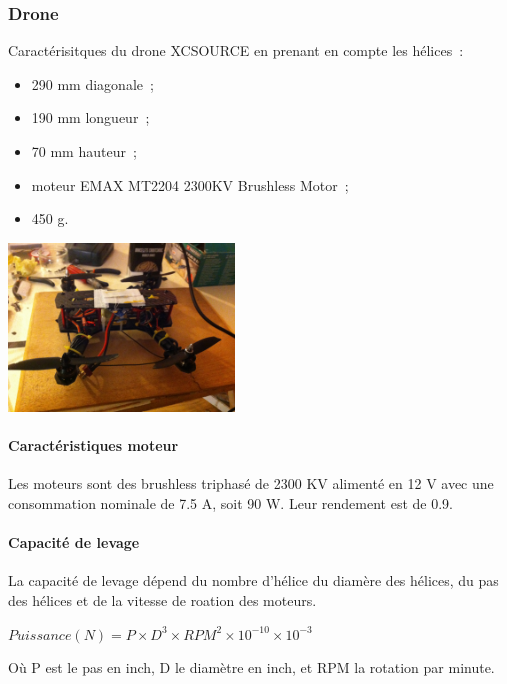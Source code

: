 \documentclass[a4paper,11pt]{article}
\begin{document}
\subsubsection{Drone}
	Caractérisitques du drone XCSOURCE en prenant en compte les hélices~: \\
	\begin{itemize}
		\item 290 mm diagonale~;
		\item 190 mm longueur~;
		\item 70 mm hauteur~;
		\item moteur EMAX MT2204 2300KV Brushless Motor~;
		\item 450 g.
	\end{itemize}
	\begin{center}
		\includegraphics[width=6cm]{../Images/drone.JPG}
	\end{center}

\paragraph{Caractéristiques moteur}

Les moteurs sont des brushless triphasé de 2300 KV alimenté en 12 V avec une consommation nominale de 7.5 A, soit 90 W. Leur rendement est de 0.9.

\paragraph{Capacité de levage}

La capacité de levage dépend du nombre d'hélice du diamère des hélices, du pas des hélices et de la vitesse de roation des moteurs.

\begin{center}
 $Puissance(N) = P \times D^3 \times RPM^2  \times 10^{-10} \times 10^{-3}$
\end{center}

Où P est le pas en inch, D le diamètre en inch, et RPM la rotation par minute.
\end{document}
